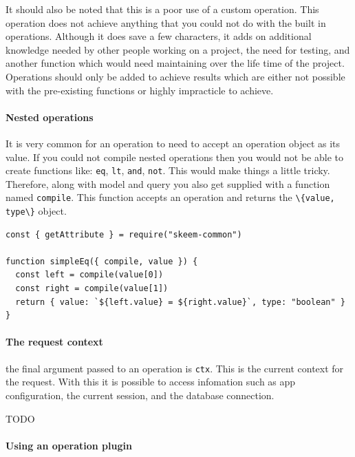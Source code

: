 \documentclass[
  12pt,
]{article}
\newcommand{\passthrough}[1]{#1}
\let\oldparagraph\paragraph
\renewcommand{\paragraph}[1]{\oldparagraph{#1}\mbox{}}
\begin{document}
It should also be noted that this is a poor use of a custom operation.
This operation does not achieve anything that you could not do with the
built in operations. Although it does save a few characters, it adds on
additional knowledge needed by other people working on a project, the
need for testing, and another function which would need maintaining over
the life time of the project. Operations should only be added to achieve
results which are either not possible with the pre-existing functions or
highly impracticle to achieve.

\hypertarget{nested-operations}{%
\paragraph{Nested operations}\label{nested-operations}}

It is very common for an operation to need to accept an operation object
as its value. If you could not compile nested operations then you would
not be able to create functions like: \passthrough{\lstinline!eq!},
\passthrough{\lstinline!lt!}, \passthrough{\lstinline!and!},
\passthrough{\lstinline!not!}. This would make things a little tricky.
Therefore, along with model and query you also get supplied with a
function named \passthrough{\lstinline!compile!}. This function accepts
an operation and returns the \passthrough{\lstinline!\{value, type\}!}
object.

\begin{lstlisting}[caption={A simple implementation of the eq operaion.}]
const { getAttribute } = require("skeem-common")

function simpleEq({ compile, value }) {
  const left = compile(value[0])
  const right = compile(value[1])
  return { value: `${left.value} = ${right.value}`, type: "boolean" }
}
\end{lstlisting}

\hypertarget{the-request-context}{%
\paragraph{The request context}\label{the-request-context}}

the final argument passed to an operation is
\passthrough{\lstinline!ctx!}. This is the current context for the
request. With this it is possible to access infomation such as app
configuration, the current session, and the database connection.

TODO

\hypertarget{using-an-operation-plugin}{%
\paragraph{Using an operation plugin}\label{using-an-operation-plugin}}
\end{document}
